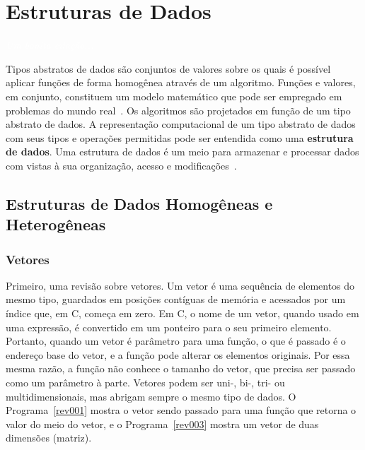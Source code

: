 \documentclass[11pt,fleqn]{book} %
\begin{document}
\chapter{Estruturas de Dados}\label{estrutura}
\vspace{6em}
\begin{flushright}
	\textit{\textcolor{white}{Um bonita citação...}}
\end{flushright}
\vspace{12em}

Tipos abstratos de dados são conjuntos de valores sobre os quais é possível aplicar funções de forma homogênea através de um algoritmo.
Funções e valores, em conjunto, constituem um modelo matemático que pode ser empregado em problemas do mundo real~\cite{ascencio2010}.
Os algoritmos são projetados em função de um tipo abstrato de dados.
A representação computacional de um tipo abstrato de dados com seus tipos e operações permitidas pode ser entendida como uma \textbf{estrutura de dados}.
Uma estrutura de dados é um meio para armazenar e processar dados com vistas à sua organização, acesso e modificações~\cite{cormen2009}.


\newpage
\section{Estruturas de Dados Homogêneas e Heterogêneas}\label{tipos}

\subsection*{Vetores}

Primeiro, uma revisão sobre vetores.
Um vetor é uma sequência de elementos do mesmo tipo, guardados em posições contíguas de memória e acessados por um índice que, em C, começa em zero.
Em C, o nome de um vetor, quando usado em uma expressão, é convertido em um ponteiro para o seu primeiro elemento.
Portanto, quando um vetor é parâmetro para uma função, o que é passado é o endereço base do vetor, e a função pode alterar os elementos originais.
Por essa mesma razão, a função não conhece o tamanho do vetor, que precisa ser passado como um parâmetro à parte.
Vetores podem ser uni-, bi-, tri- ou multidimensionais, mas abrigam sempre o mesmo tipo de dados.
O Programa~\ref{rev001} mostra o vetor sendo passado para uma função que retorna o valor do meio do vetor, e o Programa~\ref{rev003} mostra um vetor de duas dimensões (matriz).


\end{document}

